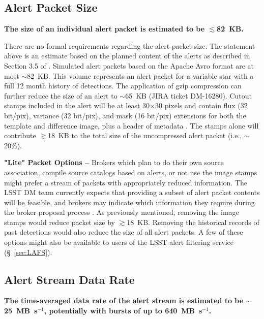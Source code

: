 \documentclass[DM,lsstdraft,authoryear,toc]{lsstdoc}
\begin{document}
\subsection{Alert Packet Size}\label{ssec:packet_size}

{\bf The size of an individual alert packet is estimated to be $\lesssim$82~KB.}

There are no formal requirements regarding the alert packet size. The statement above is an estimate based on the planned content of the alerts as described in Section 3.5 of . Simulated alert packets based on the Apache Avro format are at most $\sim$82~KB. This volume represents an alert packet for a variable star with a full 12 month history of detections. The application of gzip compression can further reduce the size of an alert to $\sim$65~KB (JIRA ticket DM-16280). Cutout stamps included in the alert will be at least 30$\times$30 pixels and contain flux (32 bit/pix), variance (32 bit/pix), and mask (16 bit/pix) extensions for both the template and difference image, plus a header of metadata . The stamps alone will contribute $\gtrsim$18~KB to the total size of the uncompressed alert packet (i.e., $\sim$20\%).

{\bf "Lite" Packet Options --} Brokers which plan to do their own source association, compile source catalogs based on alerts, or not use the image stamps might prefer a stream of packets with appropriately reduced information. The LSST DM team currently expects that providing a subset of alert packet contents will be feasible, and brokers may indicate which information they require during the broker proposal process  . As previously mentioned, removing the image stamps would reduce packet size by $\gtrsim$18~KB. Removing the historical records of past detections would also reduce the size of all alert packets. A few of these options might also be available to users of the LSST alert filtering service (\S~\ref{sec:LAFS}). 


\subsection{Alert Stream Data Rate}\label{ssec:data_rate}

{\bf The time-averaged data rate of the alert stream is estimated to be $\sim$25~MB~s$^{-1}$, potentially with bursts of up to 640~MB~s$^{-1}$.}
\end{document}
